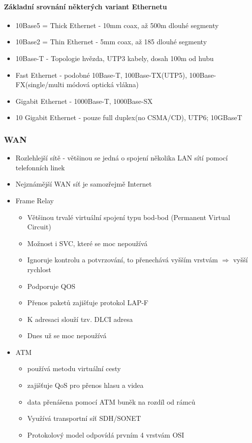 \documentclass[10pt,a4paper]{article}
\begin{document}
\paragraph{Základní srovnání některých variant Ethernetu}
\begin{itemize}
\item 10Base5 = Thick Ethernet - 10mm coax, až 500m dlouhé segmenty
\item 10Base2 = Thin Ethernet - 5mm coax, až 185 dlouhé segmenty
\item 10Base-T - Topologie hvězda, UTP3 kabely, dosah 100m od hubu
\item Fast Ethernet - podobné 10Base-T, 100Base-TX(UTP5), 100Base-FX(single/multi módová optická vlákna)
\item Gigabit Ethernet - 1000Base-T, 1000Base-SX
\item 10 Gigabit Ethernet - pouze full duplex(no CSMA/CD), UTP6; 10GBaseT
\end{itemize}

\subsubsection{WAN}

\begin{itemize}
\item Rozlehlejší sítě - většinou se jedná o spojení několika LAN sítí pomocí telefonních linek
\item Nejznámější WAN síť je samozřejmě Internet
\item Frame Relay

\begin{itemize}
\item Většinou trvalé virtuální spojení typu bod-bod (Permanent Virtual Circuit)
\item Možnost i SVC, které se moc nepoužívá
\item Ignoruje kontrolu a potvrzování, to přenechává vyšším vrstvám $\Rightarrow$ vyšší rychlost
\item Podporuje QOS
\item Přenos paketů zajišťuje protokol LAP-F
\item K adresaci slouží tzv. DLCI adresa
\item Dnes už se moc nepoužívá
\end{itemize}
\item ATM
\begin{itemize}
\item používá metodu virtuální cesty
\item zajišťuje QoS pro přenos hlasu a videa
\item data přenášena pomocí ATM buněk na rozdíl od rámců
\item Využívá transportní síť SDH/SONET
\item Protokolový model odpovídá prvním 4 vrstvám OSI
\end{itemize}
\end{itemize}
\end{document}
